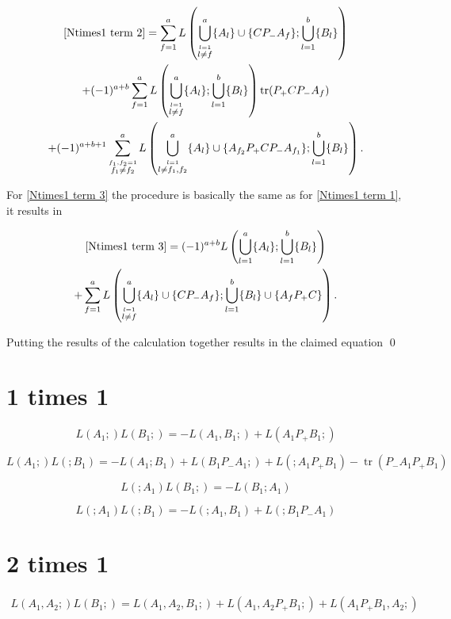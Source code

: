 \documentclass[b5paper,draft,openbib,12pt]{memoir}
\DeclareMathOperator{\tr}{tr}
\begin{document}
\begin{multline}
\eqref{Ntimes1 term 2}=\sum_{f=1}^a L\left( \bigcup_{\stackrel{l=1}{l\neq f}}^a \{A_l\}\cup \{C P_- A_f\}; \bigcup_{l=1}^b \{B_l\}\right)\\
+(-1)^{a+b}\sum_{f=1}^a  L\left( \bigcup_{\stackrel{l=1}{l\neq f}}^a \{A_l\}; \bigcup_{l=1}^b \{B_l\} \right) \tr (P_+ C P_- A_f )\\
+(-1)^{a+b+1}\sum_{\stackrel{f_1,f_2=1}{f_1\neq f_2}}^a L\left( \bigcup_{\stackrel{l=1}{l\neq f_1,f_2}}^a \{A_l\} \cup \{A_{f_2} P_+CP_- A_{f_1} \}; \bigcup_{l=1}^b \{B_l\} \right).
\end{multline}

For \eqref{Ntimes1 term 3} the procedure is basically the same as for \eqref{Ntimes1 term 1}, it results in

\begin{multline}
\eqref{Ntimes1 term 3}= (-1)^{a+b} L\left( \bigcup_{l=1}^a \{A_l\}; \bigcup_{l=1}^b \{B_l\}\right)\\
+ \sum_{f=1}^a L\left( \bigcup_{\stackrel{l=1}{l \neq f}}^a \{A_l\}\cup \{C P_- A_f\}; \bigcup_{l=1}^b \{B_l\}\cup \{A_f P_+ C\}\right).
\end{multline}

Putting the results of the calculation together results in the claimed equation \qed

\section{ 1 times 1}

\begin{equation}
L(A_1;)L(B_1;)=-L(A_1,B_1;) + L(A_1P_+B_1;)
\end{equation}

\begin{equation}
L(A_1;)L(;B_1)=-L(A_1 ;B_1) +L(B_1P_-A_1;) + L(;A_1P_+B_1) -\tr(P_-A_1P_+B_1)
\end{equation}

\begin{equation}
L(;A_1)L(B_1;)=-L(B_1;A_1)
\end{equation}

\begin{equation}
L(;A_1)L(;B_1)=-L(;A_1,B_1) + L(;B_1P_-A_1)
\end{equation}


\section{2 times 1}
\begin{multline}
L(A_1,A_2;)L(B_1;)=L(A_1,A_2,B_1;) + L(A_1,A_2P_+B_1;) + L(A_1P_+B_1,A_2;)
\end{multline}
\end{document}
